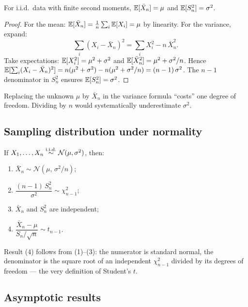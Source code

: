 \begin{propbox}
\label{prop:unbiased}
For i.i.d.\ data with finite second moments, $\mathbb{E}[\bar{X}_n] = \mu$ and
$\mathbb{E}[S_n^2] = \sigma^2$.
\end{propbox}

\begin{proof}
For the mean: $\mathbb{E}[\bar{X}_n] = \tfrac{1}{n}\sum_i \mathbb{E}[X_i] = \mu$ by
linearity. For the variance, expand:
\[
  \sum_i (X_i - \bar{X}_n)^2 = \sum_i X_i^2 - n\, \bar{X}_n^2.
\]
Take expectations: $\mathbb{E}[X_i^2] = \mu^2 + \sigma^2$ and
$\mathbb{E}[\bar{X}_n^2] = \mu^2 + \sigma^2 / n$. Hence
$\mathbb{E}[\sum_i(X_i - \bar{X}_n)^2] = n(\mu^2 + \sigma^2) - n(\mu^2 + \sigma^2/n)
= (n-1)\,\sigma^2$. The $n - 1$ denominator in $S_n^2$ ensures
$\mathbb{E}[S_n^2] = \sigma^2$.
\end{proof}

\begin{rembox}[Why $n - 1$?]
Replacing the unknown $\mu$ by $\bar{X}_n$ in the variance formula
``costs'' one degree of freedom. Dividing by $n$ would systematically
underestimate $\sigma^2$.
\end{rembox}

\subsection{Sampling distribution under normality}

\begin{thbox}
\label{th:sampling-normal}
If $X_1, \dots, X_n \overset{\text{i.i.d.}}{\sim} \mathcal{N}(\mu, \sigma^2)$, then:
\begin{enumerate}
  \item $\bar{X}_n \sim \mathcal{N}(\mu,\, \sigma^2 / n)$;
  \item $\dfrac{(n-1)\, S_n^2}{\sigma^2} \sim \chi^2_{n-1}$;
  \item $\bar{X}_n$ and $S_n^2$ are independent;
  \item $\dfrac{\bar{X}_n - \mu}{S_n / \sqrt{n}} \sim t_{n-1}$.
\end{enumerate}
\end{thbox}

\begin{rembox}
Result (4) follows from (1)--(3): the numerator is standard normal, the
denominator is the square root of an independent $\chi^2_{n-1}$ divided
by its degrees of freedom — the very definition of Student's $t$.
\end{rembox}

\subsection{Asymptotic results}

